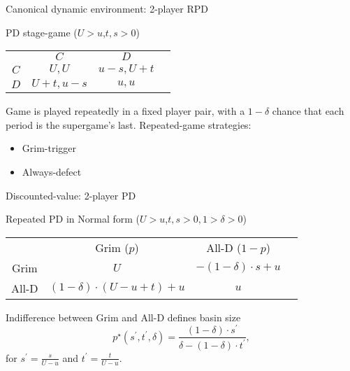 \documentclass[english]{beamer}
\begin{document}
\begin{frame}{Canonical dynamic environment: 2-player RPD}
\begin{card}
PD stage-game ($U>u$,$t,s>0$)
\begin{center}%
        \begin{tabular}{c|c|c|c}
        \multicolumn{1}{c}{} & \multicolumn{1}{c}{$C$} & \multicolumn{1}{c}{$D$} & \\ 
        \cline{2-3} \cline{3-3} 
        $C$ & $U,U$ & $u-s,U+t$ & \\ 
        \cline{2-3} \cline{3-3} 
        $D$ & $U+t,u-s$ & $u,u$ & \\ 
        \cline{2-3} \cline{3-3} 
        \end{tabular}
    \end{center}
\end{card}    

\begin{card}
 Game is played repeatedly in a fixed player pair, with a $1-\delta$ chance that each period is the supergame's last. Repeated-game strategies: 
        \begin{itemize}
            \item Grim-trigger
            \item Always-defect
        \end{itemize}
\end{card}
\end{frame}

\begin{frame}{Discounted-value: 2-player PD}
\begin{card}
Repeated PD in Normal form ($U>u$,$t,s>0, 1>\delta>0$)
    \begin{center}%
        \begin{tabular}{c|c|c|c}
        \multicolumn{1}{c}{} & \multicolumn{1}{c}{Grim ($p$)} & \multicolumn{1}{c}{All-D ($1-p$)} & \\ 
        \cline{2-3} \cline{3-3} 
        Grim & $U$ & $-(1-\delta)\cdot s+u$ & \\ 
        \cline{2-3} \cline{3-3} 
        All-D & $(1-\delta)\cdot(U-u+t)+u$ & $u$ & \\ 
        \cline{2-3} \cline{3-3} 
        \end{tabular}
    \end{center}
\end{card}    
 
 \begin{card}Indifference between Grim and All-D defines basin size
        \[
        p^{\star}(s^{\prime},t^{\prime},\delta)=\frac{(1-\delta)\cdot s^{\prime}}{\delta-(1-\delta)\cdot t^{\prime}},
        \]
        for $s^{\prime}=\tfrac{s}{U-u}$ and  $t^{\prime}=\tfrac{t}{U-u}.$
\end{card}
\end{frame}
\end{document}
